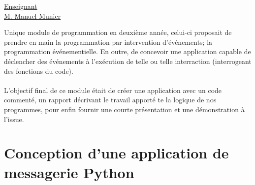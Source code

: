 \renewcommand{\figurename}{}

\vspace*{0.2cm}%
      \large
      \href{}{\color{black}Enseignant\\M. Manuel Munier}\\%
      \normalsize
\vspace*{0.5cm}%

Unique module de programmation en deuxième année, celui-ci proposait de prendre en main la programmation par intervention d'événements; la programmation événementielle. En outre, de concevoir une application capable de déclencher des événements à l'exécution de telle ou telle interraction (interrogeant des fonctions du code).
\\ \\
L'objectif final de ce module était de créer une application avec un code commenté, un rapport décrivant le travail apporté te la logique de nos programmes, pour enfin fournir une courte présentation et une démonstration à l'issue.

\section{Conception d'une application de messagerie Python}

